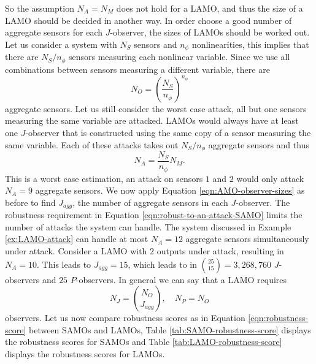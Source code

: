 So the assumption $N_A=N_M$ does not hold for a LAMO, and thus the size of a LAMO should be decided in another way. In order choose a good number of aggregate sensors for each $J$-observer, the sizes of LAMOs should be worked out. Let us consider a system with $N_S$ sensors and $n_{\phi}$ nonlinearities, this implies that there are $N_S/n_{\phi}$ sensors measuring each nonlinear variable. Since we use all combinations between sensors measuring a different variable, there are
\begin{equation}\label{eqn:num-N_O-LAMO}
    N_O = \left( \frac{N_S}{n_{\phi}} \right) ^{n_{\phi}}
\end{equation}
aggregate sensors. Let us still consider the worst case attack, all but one sensors measuring the same variable are attacked. LAMOs would always have at least one $J$-observer that is constructed using the same copy of a sensor measuring the same variable. Each of these attacks takes out $N_S/n_{\phi}$ aggregate sensors and thus
\begin{equation}\label{eqn:N_A-LAMO-MOs}
    N_A = \frac{N_S}{n_{\phi}} N_M.
\end{equation}
This is a worst case estimation, an attack on sensors $1$ and $2$ would only attack $N_A=9$ aggregate sensors. We now apply Equation \eqref{eqn:AMO-observer-sizes} as before to find $J_{agg}$, the number of aggregate sensors in each $J$-observer. The robustness requirement in Equation \eqref{eqn:robust-to-an-attack-SAMO} limits the number of attacks the system can handle. The system discussed in Example \ref{ex:LAMO-attack} can handle at most $N_A=12$ aggregate sensors simultaneously under attack. Consider a LAMO with $2$ outputs under attack, resulting in $N_A=10$. This leads to $J_{agg}=15$, which leads to in $\binom{25}{15}=3,268,760$ $J$-observers and $25$ $P$-observers. In general we can say that a LAMO requires
\begin{equation*}
    N_J = \binom{N_O}{J_{agg}}, \quad N_P = N_O
\end{equation*}
observers. Let us now compare robustness scores as in Equation \eqref{eqn:robustness-score} between SAMOs and LAMOs, Table \ref{tab:SAMO-robustness-score} displays the robustness scores for SAMOs and Table \ref{tab:LAMO-robustness-score} displays the robustness scores for LAMOs. 

